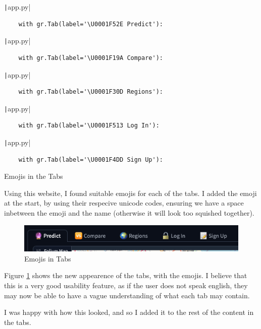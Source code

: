 \documentclass[12pt]{report}
\newcommand{\pil}[1]{\protect\texttt|#1|}
\begin{document}
\begin{listing}[H]
\pil{app.py}
\begin{verbatim}
    with gr.Tab(label='\U0001F52E Predict'):
\end{verbatim}
\pil{app.py}
\begin{verbatim}
    with gr.Tab(label='\U0001F19A Compare'):
\end{verbatim}
\pil{app.py}
\begin{verbatim}
    with gr.Tab(label='\U0001F30D Regions'):
\end{verbatim}
\pil{app.py}
\begin{verbatim}
    with gr.Tab(label='\U0001F513 Log In'):
\end{verbatim}
\pil{app.py}
\begin{verbatim}
    with gr.Tab(label='\U0001F4DD Sign Up'):
\end{verbatim}
\caption{Emojis in the Tabs}\label{cs:emojis1}
\end{listing}

Using this website, I found suitable emojis for each of the tabs. I added the emoji at the start, by using their respecive unicode codes, ensuring we have a space inbetween the emoji and the name (otherwise it will look too squished together).

\begin{figure}[H]
\centering
\includegraphics[width=13cm]{ss22.7.png}
\caption{Emojis in Tabs}\label{fig:ss22.7}
\end{figure}

Figure \ref{fig:ss22.7} shows the new appearence of the tabs, with the emojis. I believe that this is a very good usability feature, as if the user does not speak english, they may now be able to have a vague understanding of what each tab may contain.

I was happy with how this looked, and so I added it to the rest of the content in the tabs.
\end{document}
